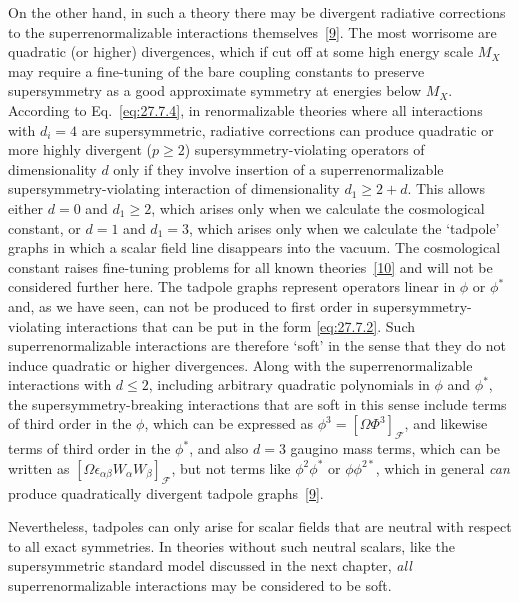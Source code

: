 On the other hand, in such a theory there may be divergent radiative
corrections to the superrenormalizable interactions
themselves~\hyperref[ch27-ref-9]{[9]}. The most worrisome are quadratic (or
higher) divergences, which if cut off at some high energy scale \(M_X\) may
require a fine-tuning of the bare coupling constants to preserve
supersymmetry as a good approximate symmetry at energies below \(M_X\).
According to Eq.~\eqref{eq:27.7.4}, in renormalizable theories where all
interactions with \(d_i=4\) are supersymmetric, radiative corrections can
produce quadratic or more highly divergent (\(p\geq2\))
supersymmetry-violating operators of dimensionality \(d\) only if they
involve insertion of a superrenormalizable supersymmetry-violating
interaction of dimensionality \(d_1\geq2+d\). This allows either \(d=0\)
and \(d_1\geq2\), which arises only when we calculate the cosmological
constant, or \(d=1\) and \(d_1=3\), which arises only when we calculate the
`tadpole' graphs in which a scalar field line disappears into the vacuum.
The cosmological constant raises fine-tuning problems for all known
theories~\hyperref[ch27-ref-10]{[10]} and will not be considered further
here. The tadpole graphs represent operators linear in \(\phi\) or \(\phi^*\)
and, as we have seen, can not be produced to first order in
supersymmetry-violating interactions that can be put in the form
\eqref{eq:27.7.2}. Such superrenormalizable interactions are therefore
`soft' in the sense that they do not induce quadratic or higher divergences.
Along with the superrenormalizable interactions with \(d\leq2\), including
arbitrary quadratic polynomials in \(\phi\) and \(\phi^*\), the
supersymmetry-breaking interactions that are soft in this sense include
terms of third order in the \(\phi\), which can be expressed as
\(\phi^3=[\Omega\Phi^3]_{\mathcal{F}}\), and likewise terms of third order
in the \(\phi^*\), and also \(d=3\) gaugino mass terms, which can be written
as \([\Omega\epsilon_{\alpha\beta}W_\alpha W_\beta]_{\mathcal{F}}\), but
not terms like \(\phi^2\phi^*\) or \(\phi\phi^{2*}\), which in general
\emph{can} produce quadratically divergent tadpole
graphs~\hyperref[ch27-ref-9]{[9]}.

Nevertheless, tadpoles can only arise for scalar fields that are neutral
with respect to all exact symmetries. In theories without such neutral
scalars, like the supersymmetric standard model discussed in the next
chapter, \emph{all} superrenormalizable interactions may be considered to be
soft.

